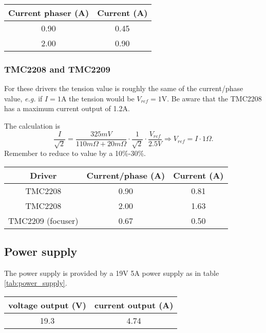 \begin{minipage}
    {.4\textwidth}
    \begin{tabular}{cc}
        Current phaser (A) & Current (A) \\
        \hline
        0.90 & 0.45 \\
        2.00 & 0.90             
    \end{tabular}
    \label{tab:drivers_curr}
\end{minipage} 

\subsubsection{TMC2208 and TMC2209}
For these drivers the tension value is roughly the same of the current/phase value, \textit{e.g.} if \(I=1\)A the tension would be \(V_{ref}=1\)V.
Be aware that the TMC2208 has a maximum current output of 1.2A.

The calculation is 
\[\frac{I}{\sqrt{2}}=\frac{325mV}{110m\Omega+20m\Omega}\cdot\frac{1}{\sqrt{2}}\cdot\frac{V_{ref}}{2.5V}\Rightarrow V_{ref} = I \cdot 1\Omega.\]
Remember to reduce to value by a 10\%-30\%.

\begin{minipage}
    {.4\textwidth}
    \begin{tabular}{ccc}
       Driver & Current/phase (A) & Current (A) \\
        \hline
       TMC2208 & 0.90 & 0.81 \\
       TMC2208 &  2.00 & 1.63 \\                
       TMC2209 (focuser) &  0.67 & 0.50                
    \end{tabular}
    \label{tab:drivers_curr}
\end{minipage} 

\subsection{Power supply}
The power supply is provided by a 19V 5A power supply as in table \ref{tab:power_supply}.

\begin{minipage}
    {.4\textwidth}
    \begin{tabular}{cc}
         voltage output (V) & current output (A) \\
         \hline
        19.3 & 4.74 \\
    \end{tabular}
    \label{tab:power_supply}
\end{minipage}

